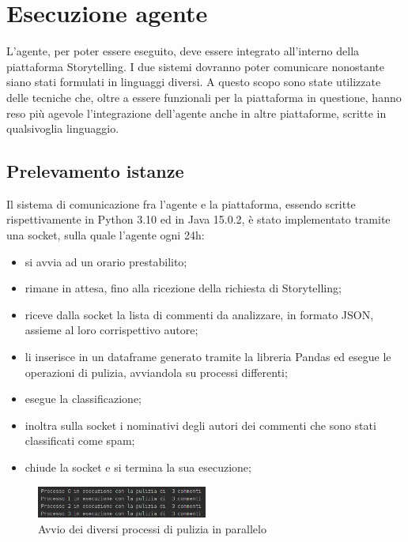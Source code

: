 \documentclass{report}
\begin{document}
    

    \chapter{Esecuzione agente}
    
    L'agente, per poter essere eseguito, deve essere integrato all'interno della piattaforma Storytelling.
    I due sistemi dovranno poter comunicare nonostante siano stati formulati in linguaggi diversi.
    \newline
    A questo scopo sono state utilizzate delle tecniche che, oltre a essere funzionali per la piattaforma in questione,
    hanno reso più agevole l'integrazione dell'agente anche in altre piattaforme, scritte in qualsivoglia linguaggio.

    \section{Prelevamento istanze}
    Il sistema di comunicazione fra l'agente e la piattaforma, essendo scritte rispettivamente in Python 3.10 ed in Java 15.0.2, è stato 
    implementato tramite una socket, sulla quale l'agente ogni 24h:
    \begin{itemize}
        \item si avvia ad un orario prestabilito;
        \item rimane in attesa, fino alla ricezione della richiesta di Storytelling;
        \item riceve dalla socket la lista di commenti da analizzare, in formato JSON, assieme al loro corrispettivo autore;
        \item li inserisce in un dataframe generato tramite la libreria Pandas ed esegue le operazioni di pulizia, avviandola su processi differenti;
        \item esegue la classificazione;
        \item inoltra sulla socket i nominativi degli autori dei commenti che sono stati classificati come spam;
        \item chiude la socket e si termina la sua esecuzione;
    \end{itemize}

    \begin{figure}[h!]
        \centering
        \includegraphics[width =0.5\textwidth]{immagini/puliziaCommenti.png}
        \caption{Avvio dei diversi processi di pulizia in parallelo}

    \end{figure}
\end{document}
